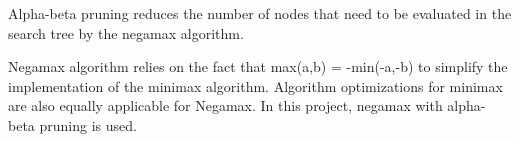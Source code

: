 \documentclass[conference,compsoc]{IEEEtran}
\begin{document}
Alpha-beta pruning reduces the number of nodes that need to be evaluated in the search tree by the negamax algorithm.

Negamax algorithm relies on the fact that max(a,b) = -min(-a,-b) to simplify the implementation of the minimax algorithm. Algorithm optimizations for minimax are also equally applicable for Negamax. In this project, negamax with alpha-beta pruning is used.
%
%



%
%
\end{document}
